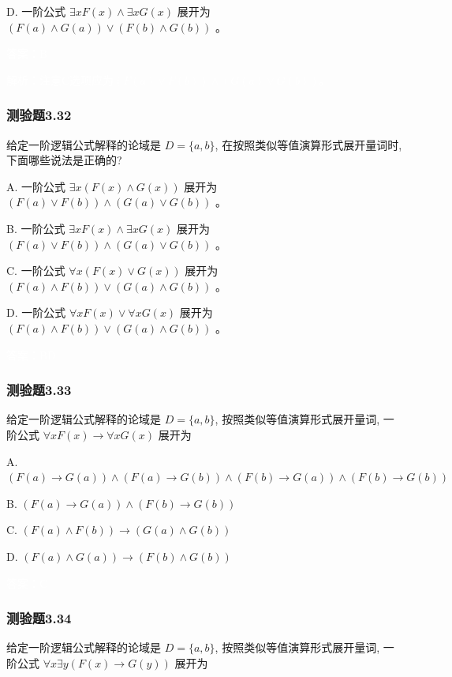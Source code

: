 \documentclass[UTF8, heading=true]{ctexart}
\begin{document}
D. 一阶公式 $\exists x F(x) \wedge \exists x G(x)$ 展开为 $(F(a) \wedge G(a)) \vee(F(b) \wedge G(b))$ 。

\textcolor{white}{答案：B}

\textcolor{white}{解析：注意C选项应为$(F(a) \vee F(b)) \wedge(G(a) \vee G(b))$。}

\subsubsection{测验题3.32}

给定一阶逻辑公式解释的论域是 $D=\{a, b\}$, 在按照类似等值演算形式展开量词时, 下面哪些说法是正确的?

A. 一阶公式 $\exists x(F(x) \wedge G(x))$ 展开为 $(F(a) \vee F(b)) \wedge(G(a) \vee G(b))$ 。

B.  一阶公式 $\exists x F(x) \wedge \exists x G(x)$ 展开为 $(F(a) \vee F(b)) \wedge(G(a) \vee G(b))$ 。

C. 一阶公式 $\forall x(F(x) \vee G(x))$ 展开为 $(F(a) \wedge F(b)) \vee(G(a) \wedge G(b))$ 。

D. 一阶公式 $\forall x F(x) \vee \forall x G(x)$ 展开为 $(F(a) \wedge F(b)) \vee(G(a) \wedge G(b))$ 。

\textcolor{white}{答案：BD}

\subsubsection{测验题3.33}

给定一阶逻辑公式解释的论域是 $D=\{a, b\}$, 按照类似等值演算形式展开量词, 一阶公式 $\forall x F(x) \rightarrow \forall x G(x)$ 展开为 $\qquad$

A. $(F(a) \rightarrow G(a)) \wedge(F(a) \rightarrow G(b)) \wedge(F(b) \rightarrow G(a)) \wedge(F(b) \rightarrow G(b))$

B. $(F(a) \rightarrow G(a)) \wedge(F(b) \rightarrow G(b))$

C. $(F(a) \wedge F(b)) \rightarrow(G(a) \wedge G(b))$

D. $(F(a) \wedge G(a)) \rightarrow(F(b) \wedge G(b))$

\textcolor{white}{答案：C}

\subsubsection{测验题3.34}

给定一阶逻辑公式解释的论域是 $D=\{a, b\}$, 按照类似等值演算形式展开量词, 一阶公式 $\forall x \exists y(F(x) \rightarrow G(y))$ 展开为 $\qquad$
\end{document}
